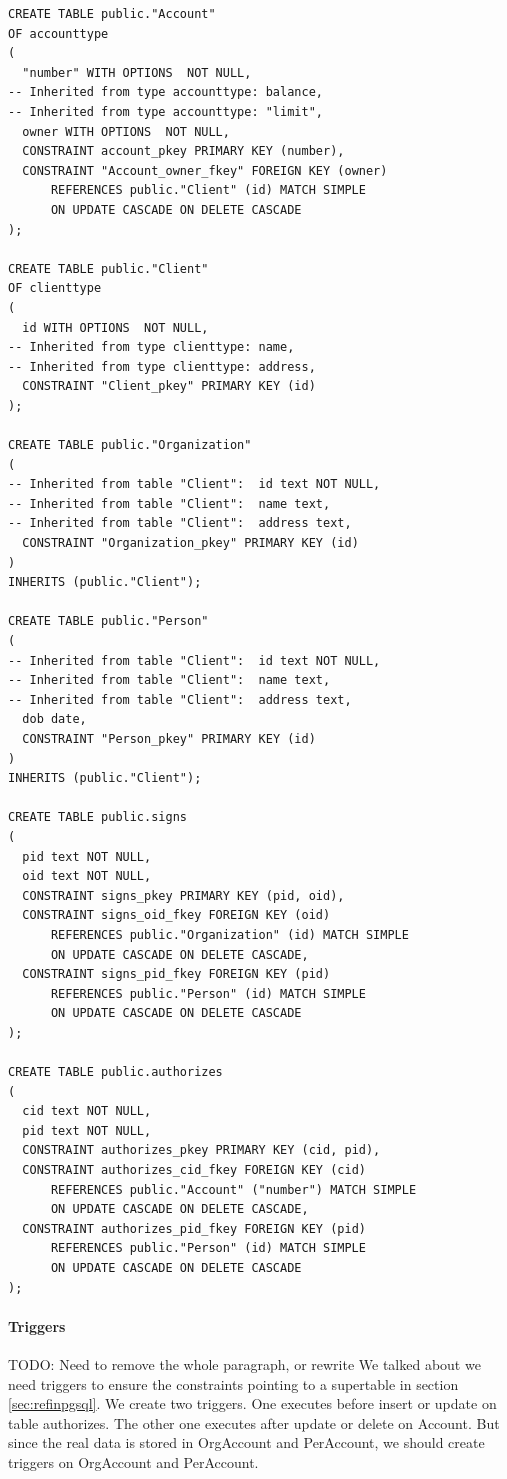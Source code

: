 \documentclass[11pt]{article}
\begin{document}
\begin{verbatim}
CREATE TABLE public."Account"
OF accounttype
(
  "number" WITH OPTIONS  NOT NULL,
-- Inherited from type accounttype: balance,
-- Inherited from type accounttype: "limit",
  owner WITH OPTIONS  NOT NULL,
  CONSTRAINT account_pkey PRIMARY KEY (number),
  CONSTRAINT "Account_owner_fkey" FOREIGN KEY (owner)
      REFERENCES public."Client" (id) MATCH SIMPLE
      ON UPDATE CASCADE ON DELETE CASCADE
);

CREATE TABLE public."Client"
OF clienttype
(
  id WITH OPTIONS  NOT NULL,
-- Inherited from type clienttype: name,
-- Inherited from type clienttype: address,
  CONSTRAINT "Client_pkey" PRIMARY KEY (id)
);

CREATE TABLE public."Organization"
(
-- Inherited from table "Client":  id text NOT NULL,
-- Inherited from table "Client":  name text,
-- Inherited from table "Client":  address text,
  CONSTRAINT "Organization_pkey" PRIMARY KEY (id)
)
INHERITS (public."Client");

CREATE TABLE public."Person"
(
-- Inherited from table "Client":  id text NOT NULL,
-- Inherited from table "Client":  name text,
-- Inherited from table "Client":  address text,
  dob date,
  CONSTRAINT "Person_pkey" PRIMARY KEY (id)
)
INHERITS (public."Client");

CREATE TABLE public.signs
(
  pid text NOT NULL,
  oid text NOT NULL,
  CONSTRAINT signs_pkey PRIMARY KEY (pid, oid),
  CONSTRAINT signs_oid_fkey FOREIGN KEY (oid)
      REFERENCES public."Organization" (id) MATCH SIMPLE
      ON UPDATE CASCADE ON DELETE CASCADE,
  CONSTRAINT signs_pid_fkey FOREIGN KEY (pid)
      REFERENCES public."Person" (id) MATCH SIMPLE
      ON UPDATE CASCADE ON DELETE CASCADE
);

CREATE TABLE public.authorizes
(
  cid text NOT NULL,
  pid text NOT NULL,
  CONSTRAINT authorizes_pkey PRIMARY KEY (cid, pid),
  CONSTRAINT authorizes_cid_fkey FOREIGN KEY (cid)
      REFERENCES public."Account" ("number") MATCH SIMPLE
      ON UPDATE CASCADE ON DELETE CASCADE,
  CONSTRAINT authorizes_pid_fkey FOREIGN KEY (pid)
      REFERENCES public."Person" (id) MATCH SIMPLE
      ON UPDATE CASCADE ON DELETE CASCADE
);
\end{verbatim}

\paragraph{Triggers}
\par
TODO: Need to remove the whole paragraph, or rewrite
\iffalse
We talked about we need triggers to ensure the constraints pointing to a supertable in section \ref{sec:refinpgsql}. We create two triggers. One executes before insert or update on table authorizes. The other one executes after update or delete on Account. But since the real data is stored in OrgAccount and PerAccount, we should create triggers on OrgAccount and PerAccount.
\end{document}
